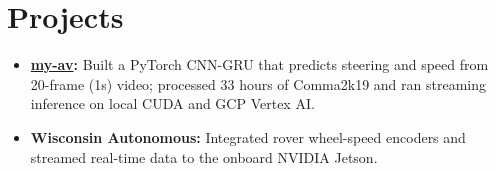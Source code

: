 \documentclass[11pt, letterpaper]{article}
\begin{document}
\section{Projects}
\begin{itemize}
  \item \textbf{\href{https://github.com/lordphone/my-av}{my-av}:} Built a PyTorch CNN-GRU that predicts steering and speed from 20-frame (1s) video; processed 33 hours of Comma2k19 and ran streaming inference on local CUDA and GCP Vertex AI.
  \item \textbf{Wisconsin Autonomous:} Integrated rover wheel-speed encoders and streamed real-time data to the onboard NVIDIA Jetson.
\end{itemize}
\end{document}
